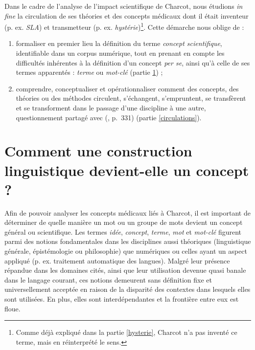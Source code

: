 Dans le cadre de l'analyse de l'impact scientifique de Charcot, nous étudions \textit{in fine} la circulation de ses théories et des concepts médicaux dont il était inventeur (p. ex. \textit{SLA}) et transmetteur (p. ex. \textit{hystérie})\footnote{Comme déjà expliqué dans la partie \ref{hysterie}, Charcot n'a pas inventé ce terme, mais en réinterprété le sens.}. Cette démarche nous oblige de :
\begin{enumerate}
\item formaliser en premier lieu la définition du terme \textit{concept scientifique}, identifiable dans un corpus numérique, tout en prenant en compte les difficultés inhérentes à la définition d'un concept \textit{per se}, ainsi qu'à celle de ses termes apparentés : \textit{terme} ou \textit{mot-clé} (partie \ref{concept}) ;
\item comprendre, conceptualiser et opérationnaliser \og{}comment des concepts, des théories ou des méthodes circulent, s'échangent, s'empruntent, se transfèrent et se transforment dans le passage d'une discipline à une autre\fg{}, questionnement partagé avec \citeauthor{landais2014frederic} (\citeyear{landais2014frederic}, p.~331) (partie \ref{circulations}).
\end{enumerate}



\section{Comment une construction linguistique devient-elle un concept ?}
\label{concept}

Afin de pouvoir analyser les concepts médicaux liés à Charcot, il est important de déterminer de quelle manière un mot ou un groupe de mots devient un concept général ou scientifique. Les termes \textit{idée}, \textit{concept}, \textit{terme}, \textit{mot} et \textit{mot-clé} figurent parmi des notions fondamentales dans les disciplines aussi théoriques (linguistique générale, épistémologie ou philosophie) que numériques ou celles ayant un aspect appliqué (p. ex. traitement automatique des langues). 
Malgré leur présence répandue dans les domaines cités, ainsi que leur utilisation devenue quasi banale dans le langage courant, ces notions demeurent sans définition fixe et universellement acceptée en raison de la disparité des contextes dans lesquels elles sont utilisées. En plus, elles sont interdépendantes et la frontière entre eux est floue. 

